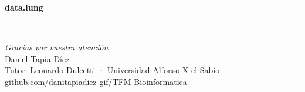 \documentclass[aspectratio=169, 11pt]{beamer}
\begin{document}
{
\begin{frame}[plain]
  \vspace{1.2cm}
  \begin{center}
    {\ttfamily\fontsize{70pt}{70pt}\selectfont\bfseries
     data\textcolor{verdeTerm}{.}lung}\\[0.3cm]

    \textcolor{verdeTerm}{\rule{2cm}{2pt}}\\[0.4cm]

    {\Large\itshape\color{tinta2}Gracias por vuestra atención}\\[1cm]

    {\small\color{tinta2}Daniel Tapia Díez}\\[0.1cm]
    {\small\color{tinta2}Tutor: Leonardo Dulcetti · Universidad Alfonso X el Sabio}\\[0.4cm]
    {\ttfamily\small\color{mute}github.com/danitapiadiez-gif/TFM-Bioinformatica}
  \end{center}
\end{frame}
}
\end{document}
